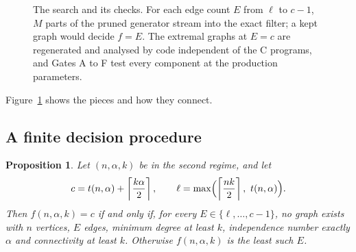 \documentclass[11pt]{article}
\newtheorem{proposition}[theorem]{Proposition}
\theoremstyle{definition}
\theoremstyle{remark}
\newcommand{\ceil}[1]{\left\lceil #1\right\rceil}
\begin{document}
\begin{figure}[t]
\centering
{}
\caption{The search and its checks. For each edge count $E$ from $\ell$ to $c-1$, $M$ parts of the pruned generator
stream into the exact filter; a kept graph would decide $f=E$. The extremal graphs at $E=c$ are regenerated and
analysed by code independent of the C programs, and Gates A to F test every component at the production
parameters.}
\label{fig:pipeline}
\end{figure}

Figure~\ref{fig:pipeline} shows the pieces and how they connect.

\subsection{A finite decision procedure}

\begin{proposition}\label{prop:finite}
Let $(n,\alpha,k)$ be in the second regime, and let
\begin{equation}\label{eq:range}
c=t(n,\alpha)+\ceil{\frac{k\alpha}{2}},\qquad \ell=\max\Bigl(\ceil{\frac{nk}{2}},\ t(n,\alpha)\Bigr).
\end{equation}
Then $f(n,\alpha,k)=c$ if and only if, for every $E\in\{\ell,\dots,c-1\}$, no graph exists with $n$ vertices, $E$
edges, minimum degree at least $k$, independence number exactly $\alpha$ and connectivity at least $k$. Otherwise
$f(n,\alpha,k)$ is the least such $E$.
\end{proposition}
\end{document}
